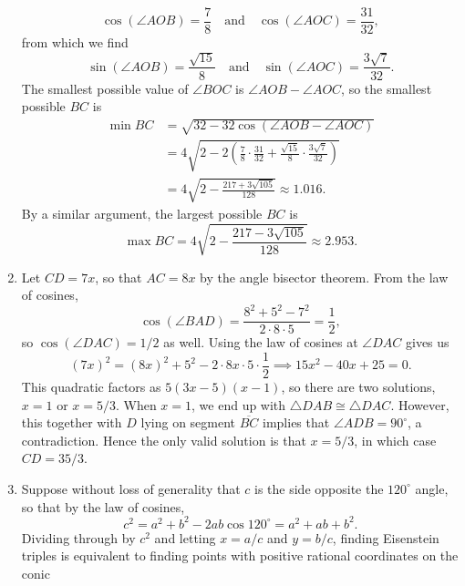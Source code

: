 \begin{enumerate}
\begin{equation*}
\cos(\angle AOB) = \frac{7}{8}\quad\text{and}\quad\cos(\angle AOC) = \frac{31}{32},
\end{equation*}
from which we find
\begin{equation*}
\sin(\angle AOB) = \frac{\sqrt{15}}{8}\quad\text{and}\quad\sin(\angle AOC) = \frac{3\sqrt{7}}{32}.
\end{equation*}
The smallest possible value of $\angle BOC$ is $\angle AOB - \angle AOC$, so the smallest possible $BC$ is
\begin{align*}
\min BC &= \sqrt{32 - 32\cos(\angle AOB - \angle AOC)} \\
&= 4\sqrt{2 - 2\left(\frac{7}{8}\cdot\frac{31}{32} + \frac{\sqrt{15}}{8}\cdot\frac{3\sqrt{7}}{32}\right)} \\
&= 4\sqrt{2 - \frac{217 + 3\sqrt{105}}{128}}\approx 1.016.
\end{align*}
By a similar argument, the largest possible $BC$ is
\begin{equation*}
\max BC = 4\sqrt{2 - \frac{217 - 3\sqrt{105}}{128}}\approx 2.953.
\end{equation*}
\item Let $CD = 7x$, so that $AC = 8x$ by the angle bisector theorem. From the law of cosines,
\begin{equation*}
\cos(\angle BAD) = \frac{8^2 + 5^2 - 7^2}{2\cdot 8\cdot 5} = \frac{1}{2},
\end{equation*}
so $\cos(\angle DAC) = 1/2$ as well. Using the law of cosines at $\angle DAC$ gives us
\begin{equation*}
(7x)^2 = (8x)^2 + 5^2 - 2\cdot 8x\cdot 5\cdot\frac{1}{2}\implies 15x^2 - 40x + 25 = 0.
\end{equation*}
This quadratic factors as $5(3x - 5)(x - 1)$, so there are two solutions, $x = 1$ or $x = 5/3$. When $x = 1$, we end up with $\triangle DAB\cong\triangle DAC$. However, this together with $D$ lying on segment $\overline{BC}$ implies that $\angle ADB = 90^{\circ}$, a contradiction. Hence the only valid solution is that $x = 5/3$, in which case $CD = 35/3$.
\item Suppose without loss of generality that $c$ is the side opposite the $120^{\circ}$ angle, so that by the law of cosines,
\begin{equation*}
c^2 = a^2 + b^2 - 2ab\cos 120^{\circ} = a^2 + ab + b^2.
\end{equation*}
Dividing through by $c^2$ and letting $x = a/c$ and $y = b/c$, finding Eisenstein triples is equivalent to finding points with positive rational coordinates on the conic

\end{enumerate}
